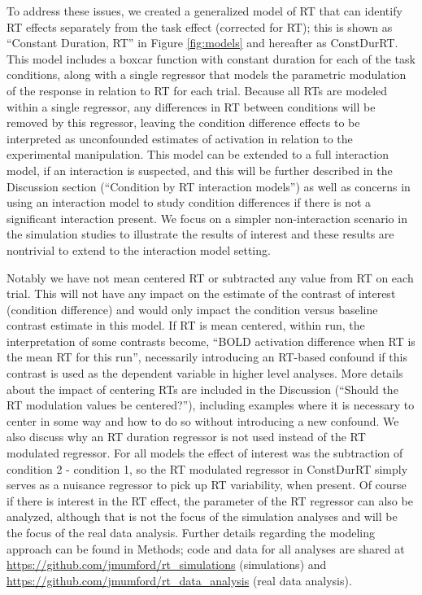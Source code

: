 \documentclass[titlepage,12pt] {article}
\begin{document}
To address these issues, we created a generalized model of RT that can identify RT effects separately from the task effect (corrected for RT); this is shown as ``Constant Duration, RT'' in Figure \ref{fig:models} and hereafter as ConstDurRT.  This model includes a boxcar function with constant duration for each of the task conditions, along with a single regressor that models the parametric modulation of the response in relation to RT for each trial. Because all RTs are modeled within a single regressor, any differences in RT between conditions will be removed by this regressor, leaving the condition difference effects to be interpreted as unconfounded estimates of activation in relation to the experimental manipulation. This model can be extended to a full interaction model, if an interaction is suspected, and this will be further described in the Discussion section (``Condition by RT interaction models'') as well as concerns in using an interaction model to study condition differences if there is not a significant interaction present.  We focus on a simpler non-interaction scenario in the simulation studies to illustrate the results of interest and these results are nontrivial to extend to the interaction model setting.

Notably we have not mean centered RT or subtracted any value from RT on each trial.  This will not have any impact on the estimate of the contrast of interest (condition difference) and would only impact the condition versus baseline contrast estimate in this model.  If RT is mean centered, within run, the interpretation of some contrasts become, ``BOLD activation difference when RT is the mean RT for this run'', necessarily introducing an RT-based confound if this contrast is used as the dependent variable in higher level analyses.  More details about the impact of centering RTs are included in the Discussion (``Should the RT modulation values be centered?''), including examples where it is necessary to center in some way and how to do so without introducing a new confound.  We also discuss why an RT duration regressor is not used instead of the RT modulated regressor. For all models the effect of interest was the subtraction of condition 2 - condition 1, so the RT modulated regressor in ConstDurRT simply serves as a nuisance regressor to pick up RT variability, when present.  Of course if there is interest in the RT effect, the parameter of the RT regressor can also be analyzed, although that is not the focus of the simulation analyses and will be the focus of the real data analysis.  Further details regarding the modeling approach can be found in Methods; code and data for all analyses are shared at \url{https://github.com/jmumford/rt_simulations} (simulations) and \url{https://github.com/jmumford/rt_data_analysis} (real data analysis).
\end{document}
